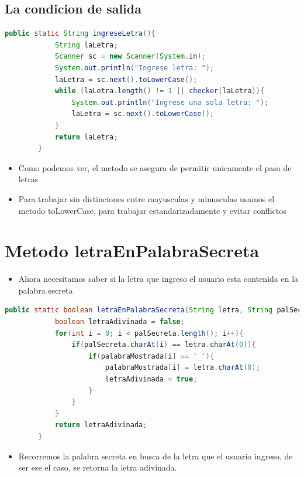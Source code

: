 \documentclass{article}
\begin{document}
        \subsection{La condicion de salida}
        \begin{lstlisting}[language=java, caption={Metodo ingreseLetra}]
        public static String ingreseLetra(){
            String laLetra;
            Scanner sc = new Scanner(System.in);
            System.out.println("Ingrese letra: ");
            laLetra = sc.next().toLowerCase();
            while (laLetra.length() != 1 || checker(laLetra)){
                System.out.println("Ingrese una sola letra: ");
                laLetra = sc.next().toLowerCase();
            }
            return laLetra;
        }

        \end{lstlisting}
        \begin{itemize}
            \item Como podemos ver, el metodo se asegura de permitir unicamente el paso de letras
            \item Para trabajar sin distinciones entre mayusculas y minusculas usamos el metodo toLowerCase, para trabajar estandarizadamente y evitar conflictos
        \end{itemize}

        \section{Metodo letraEnPalabraSecreta}
        \begin{itemize}
            \item Ahora necesitamos saber si la letra que ingreso el usuario esta contenida en la palabra secreta
        \end{itemize}
        \begin{lstlisting}[language=java, caption={Implementacion del metodo letraEnPalabraSecreta}]
        public static boolean letraEnPalabraSecreta(String letra, String palSecreta, char[] palabraMostrada){
            boolean letraAdivinada = false;
            for(int i = 0; i < palSecreta.length(); i++){
                if(palSecreta.charAt(i) == letra.charAt(0)){
                    if(palabraMostrada[i] == '_'){
                        palabraMostrada[i] = letra.charAt(0);
                        letraAdivinada = true;
                    }
                }
            }
            return letraAdivinada;
        }       
        \end{lstlisting}
        \begin{itemize}
            \item Recorremos la palabra secreta en busca de la letra que el usuario ingreso, de ser ese el caso, se retorna la letra adivinada.
        \end{itemize}
\end{document}
